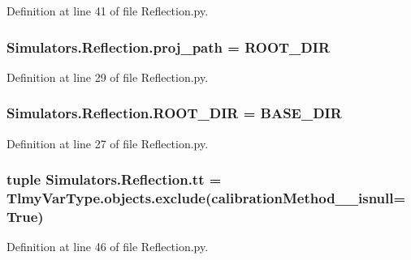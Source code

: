 Definition at line 41 of file Reflection.\+py.

\hypertarget{namespace_simulators_1_1_reflection_ae6bb432004b1bbdb718f64f77c7538e3}{}
\subsubsection[{proj\+\_\+path}]{\setlength{\rightskip}{0pt plus 5cm}Simulators.\+Reflection.\+proj\+\_\+path = {\bf R\+O\+O\+T\+\_\+\+D\+I\+R}}\label{namespace_simulators_1_1_reflection_ae6bb432004b1bbdb718f64f77c7538e3}


Definition at line 29 of file Reflection.\+py.

\hypertarget{namespace_simulators_1_1_reflection_a728f4dae871184e90c6d7dd3a693a53e}{}
\subsubsection[{R\+O\+O\+T\+\_\+\+D\+I\+R}]{\setlength{\rightskip}{0pt plus 5cm}Simulators.\+Reflection.\+R\+O\+O\+T\+\_\+\+D\+I\+R = B\+A\+S\+E\+\_\+\+D\+I\+R}\label{namespace_simulators_1_1_reflection_a728f4dae871184e90c6d7dd3a693a53e}


Definition at line 27 of file Reflection.\+py.

\hypertarget{namespace_simulators_1_1_reflection_a67aec4ca0b1d15b76e83183c3e61675e}{}
\subsubsection[{tt}]{\setlength{\rightskip}{0pt plus 5cm}tuple Simulators.\+Reflection.\+tt = Tlmy\+Var\+Type.\+objects.\+exclude(calibration\+Method\+\_\+\+\_\+isnull=True)}\label{namespace_simulators_1_1_reflection_a67aec4ca0b1d15b76e83183c3e61675e}


Definition at line 46 of file Reflection.\+py.

